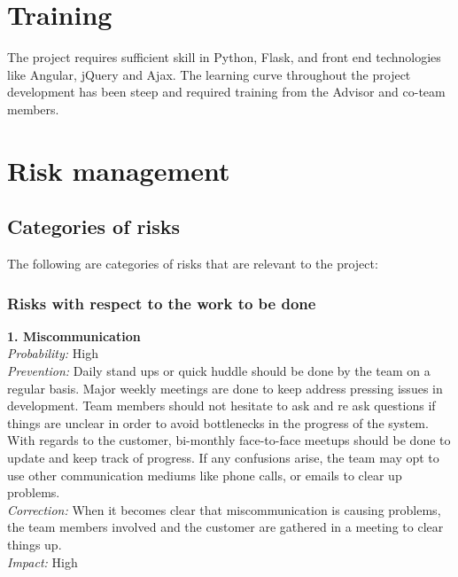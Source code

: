 \documentclass{report}
\begin{document}
\section{Training}
The project requires sufficient skill in Python, Flask, and front end technologies like Angular, jQuery and Ajax. The learning curve throughout the project development has been steep and required training from the Advisor and co-team members. 

\section{Risk management}

\subsection{Categories of risks}
The following are categories of risks that are relevant to the project: 

\subsubsection{Risks with respect to the work to be done}
\textbf{1. Miscommunication} \\
\textit{Probability:} High \\
\textit{Prevention:} Daily stand ups or quick huddle should be done by the team on a regular basis. Major weekly meetings are done to keep address pressing issues in development. Team members should not hesitate to ask and re ask questions if things are unclear in order to avoid bottlenecks in the progress of the system. With regards to the customer, bi-monthly face-to-face meetups should be done to update and keep track of progress. If any confusions arise, the team may opt to use other communication mediums like phone calls, or emails to clear up problems. \\
\textit{Correction:} When it becomes clear that miscommunication is causing problems, the team members involved and the customer are gathered in a meeting to clear things up. \\
\textit{Impact:} High \\
\end{document}
